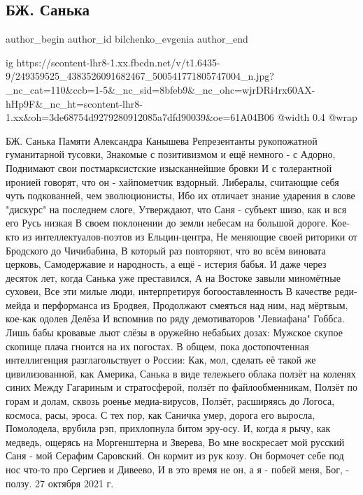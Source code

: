  
 
 
 
 
 
\subsection{БЖ. Санька}
\label{sec:27_10_2021.fb.bilchenko_evgenia.2.sanjka_pamjati_aleksandra_kanysheva}
 
\ifcmt
 author_begin
   author_id bilchenko_evgenia
 author_end
\fi

\ifcmt
  ig https://scontent-lhr8-1.xx.fbcdn.net/v/t1.6435-9/249359525_4383526091682467_500541771805747004_n.jpg?_nc_cat=110&ccb=1-5&_nc_sid=8bfeb9&_nc_ohc=wjrDRi4rx60AX-hHp9F&_nc_ht=scontent-lhr8-1.xx&oh=3de68754d9279280912085a7dfd90039&oe=61A04B06
  @width 0.4
  @wrap 
\fi

БЖ. Санька
Памяти Александра Канышева
Репрезентанты рукопожатной гуманитарной тусовки,
Знакомые с позитивизмом и ещё немного - с Адорно,
Поднимают свои постмарксистские изысканнейшие бровки
И с толерантной иронией говорят, что он - хайпометчик вздорный.
Либералы, считающие себя чуть подкованней, чем эволюционисты,
Ибо их отличает знание ударения в слове "дискурс" на последнем слоге,
Утверждают, что Саня - субъект шизо, как и вся его Русь низкая
В своем поклонении до земли небесам на большой дороге.
Кое-кто из интеллектуалов-поэтов из Ельцин-центра,
Не меняющие своей риторики от Бродского до Чичибабина,
В который раз повторяют, что во всём виновата церковь,
Самодержавие и народность, а ещё - истерия бабья.
И даже через десяток лет, когда Санька уже преставился,
А на Востоке завыли миномётные суховеи,
Все эти милые люди, интерпретируя богооставленность
В качестве реди-мейда и перформанса из Бродвея,
Продолжают смеяться над ним, над мёртвым, кое-как одолев Делёза
И вспомнив по ряду демотиваторов "Левиафана" Гоббса.
Лишь бабы кровавые льют слёзы в оружейно небабьих дозах:
Мужское скупое скопище плача гноится на их погостах.
В общем, пока достопочтенная интеллигенция разглагольствует о России:
Как, мол, сделать её такой же цивилизованной, как Америка,
Санька в виде тележьего облака ползёт на коленях синих
Между Гагариным и стратосферой, ползёт по файлообменникам,
Ползёт по горам и долам, сквозь роенье медиа-вирусов,
Ползёт, расширяясь до Логоса, космоса, расы, эроса.
С тех пор, как Саничка умер, дорога его выросла,
Помолодела, врубила рэп, прихлопнула битом эру-осу.
И, когда я рычу, как медведь, ощерясь на Моргенштерна и Зверева,
Во мне воскресает мой русский Саня - мой Серафим Саровский. Он кормит из рук козу.
Он бормочет себе под нос что-то про Сергиев и Дивеево,
И в это время не он, а я - побей меня, Бог, - ползу.
27 октября 2021 г.
